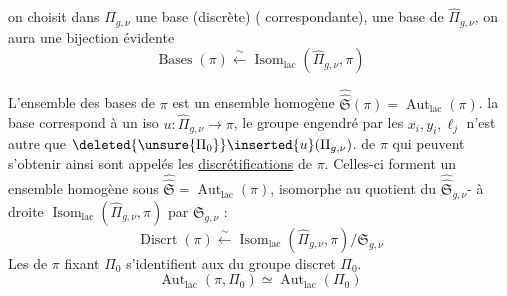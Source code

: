

 on choisit dans $\Pi_{g,\nu}$ une base (discrète) ( correspondante),  une base de $\widehat{\Pi}_{g,\nu}$, on aura une bijection évidente
\[
\operatorname{Bases}(\pi) \xleftarrow{\sim} \operatorname{Isom}_{\mathrm{lac}}(\widehat{\Pi}_{g,\nu},\pi)
\tag{5}
\]

L'ensemble des bases de $\pi$ est un ensemble homogène   $\widehat{\widehat{\mathfrak S}}(\pi)=\operatorname{Aut}_{\mathrm{lac}}(\pi)$.  la  base correspond à un iso $u:\widehat{\Pi}_{g,\nu}\longrightarrow\pi$, le groupe  engendré par les $x_i,y_i,\ell_j$ n'est autre que $\deleted{\unsure{\Pi_0}}\inserted{u}(\Pi_{g,\nu})$.   de $\pi$ qui peuvent s'obtenir ainsi sont appelés les \uline{discrétifications} de $\pi$. Celles-ci forment un ensemble homogène sous $\widehat{\widehat{\mathfrak S}}=\operatorname{Aut}_{\mathrm{lac}}(\pi)$,  isomorphe au quotient du $\widehat{\widehat{\mathfrak S}}_{g,\nu}$- à droite $\operatorname{Isom}_{\mathrm{lac}}(\widehat{\Pi}_{g,\nu},\pi)$ par $\mathfrak S_{g,\nu}$ :
\[
\operatorname{Discrt}(\pi) \xleftarrow{\sim} \operatorname{Isom}_{\mathrm{lac}}(\widehat{\Pi}_{g,\nu},\pi)/\mathfrak S_{g,\nu}
\tag{6}
\]
Les   de $\pi$ fixant  $\Pi_0$ s'identifient aux  du groupe discret  $\Pi_0$.
\[
\operatorname{Aut}_{\mathrm{lac}}(\pi,\Pi_0)\simeq\operatorname{Aut}_{\mathrm{lac}}(\Pi_0)
\tag{7}
\]


